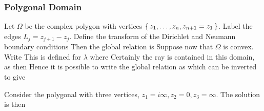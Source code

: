 \documentclass{article}
\begin{document}
\subsubsection{Polygonal Domain}
Let $\Omega$ be the complex polygon with vertices $\set{z_1,\dots, z_n, z_{n+1} = z_1}$. Label the edges $L_j = z_{j+1}-z_j$. Define the transform of the Dirichlet and Neumann boundary conditions
Then the global relation is 
Suppose now that $\Omega$ is convex. Write 
This is defined for $\lambda$ where
Certainly the ray 
is contained in this domain, as then 
Hence it is possible to write the global relation as 
which can be inverted to give

\begin{example}
Consider the polygonal with three vertices, $z_1 = i\infty, z_2 = 0, z_3 = \infty$. The solution is then 
\end{example}
\end{document}
